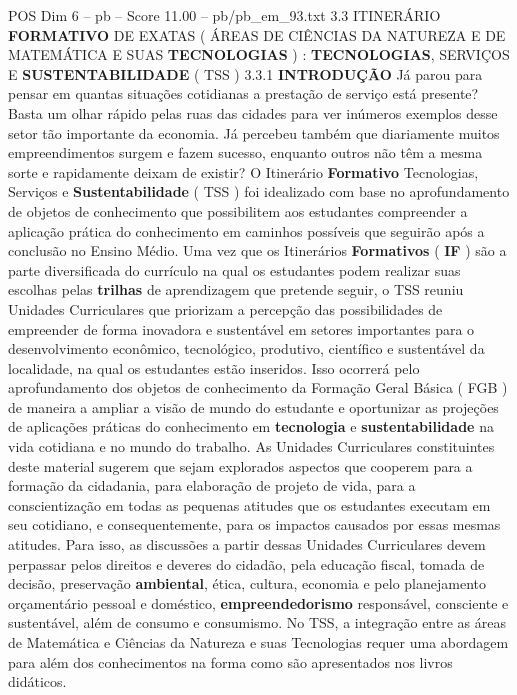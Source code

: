 \begin{textsample}{POS Dim 6 – pb – Score 11.00 – pb/pb\_em\_93.txt}  \label{ex:f6_pos_204}
3.3 ITINERÁRIO \textbf{FORMATIVO} DE EXATAS ( ÁREAS DE CIÊNCIAS DA NATUREZA E DE MATEMÁTICA E SUAS \textbf{TECNOLOGIAS} ) : \textbf{TECNOLOGIAS}, SERVIÇOS E \textbf{SUSTENTABILIDADE} ( TSS ) 3.3.1 \textbf{INTRODUÇÃO} Já parou para pensar em quantas situações cotidianas a prestação de serviço está presente?
Basta um olhar rápido pelas ruas das cidades para ver inúmeros exemplos desse setor tão importante da economia.
Já percebeu também que diariamente muitos empreendimentos surgem e fazem sucesso, enquanto outros não têm a mesma sorte e rapidamente deixam de existir?
O Itinerário \textbf{Formativo} Tecnologias, Serviços e \textbf{Sustentabilidade} ( TSS ) foi idealizado com base no aprofundamento de objetos de conhecimento que possibilitem aos estudantes compreender a aplicação prática do conhecimento em caminhos possíveis que seguirão após a conclusão no Ensino Médio.
Uma vez que os Itinerários \textbf{Formativos} ( \textbf{IF} ) são a parte diversificada do currículo na qual os estudantes podem realizar suas escolhas pelas \textbf{trilhas} de aprendizagem que pretende seguir, o TSS reuniu Unidades Curriculares que priorizam a percepção das possibilidades de empreender de forma inovadora e sustentável em setores importantes para o desenvolvimento econômico, tecnológico, produtivo, científico e sustentável da localidade, na qual os estudantes estão inseridos.
Isso ocorrerá pelo aprofundamento dos objetos de conhecimento da Formação Geral Básica ( FGB ) de maneira a ampliar a visão de mundo do estudante e oportunizar as projeções de aplicações práticas do conhecimento em \textbf{tecnologia} e \textbf{sustentabilidade} na vida cotidiana e no mundo do trabalho.
As Unidades Curriculares constituintes deste material sugerem que sejam explorados aspectos que cooperem para a formação da cidadania, para elaboração de projeto de vida, para a conscientização em todas as pequenas atitudes que os estudantes executam em seu cotidiano, e consequentemente, para os impactos causados por essas mesmas atitudes.
Para isso, as discussões a partir dessas Unidades Curriculares devem perpassar pelos direitos e deveres do cidadão, pela educação fiscal, tomada de decisão, preservação \textbf{ambiental}, ética, cultura, economia e pelo planejamento orçamentário pessoal e doméstico, \textbf{empreendedorismo} responsável, consciente e sustentável, além de consumo e consumismo.
No TSS, a integração entre as áreas de Matemática e Ciências da Natureza e suas Tecnologias requer uma abordagem para além dos conhecimentos na forma como são apresentados nos livros didáticos.

\end{textsample}
